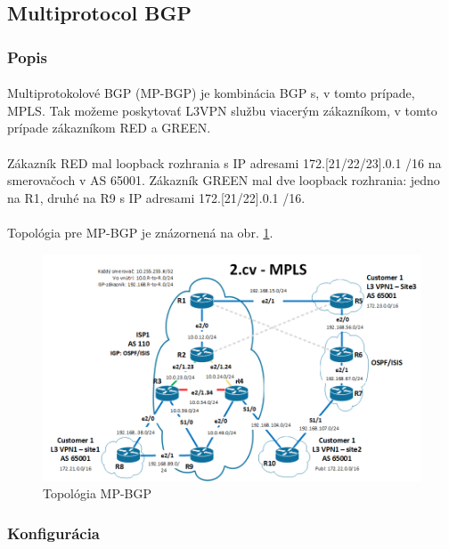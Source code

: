 \documentclass[12pt,twoside,a4paper]{report}
\begin{document}
\subsection{Multiprotocol BGP}
\subsubsection{Popis}
\paragraph{}
Multiprotokolové BGP (MP-BGP) je kombinácia BGP s, v tomto prípade, MPLS. Tak možeme poskytovať L3VPN službu viacerým zákazníkom, v tomto prípade zákazníkom RED a GREEN.

\paragraph{}
Zákazník RED mal loopback rozhrania s IP adresami 172.[21/22/23].0.1 /16 na smerovačoch v AS 65001. Zákazník GREEN mal dve loopback rozhrania: jedno na R1, druhé na R9 s IP adresami 172.[21/22].0.1 /16.

\paragraph{}
Topológia pre MP-BGP je znázornená na obr. \ref{fig:mpls_mpbgp_topo}.

\begin{figure}[!htbp]
\centering
\includegraphics[width=14cm,keepaspectratio]{mpls_l3vpn_topo}
\caption{Topológia MP-BGP}
\label{fig:mpls_mpbgp_topo}
\end{figure}

\subsubsection{Konfigurácia}
\end{document}
